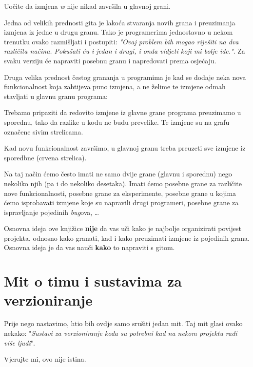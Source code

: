 

Uočite da izmjena \emph w nije nikad završila u glavnoj grani. 

Jedna od velikih prednosti gita je lakoća stvaranja novih grana i preuzimanja izmjena iz jedne u drugu granu. 
Tako je programerima jednostavno u nekom trenutku ovako razmišljati i postupiti: \emph{"Ovaj problem bih mogao riješiti na dva različita načina. Pokušati ću i jedan i drugi, i onda vidjeti koji mi bolje ide."}. Za svaku verziju će napraviti posebnu granu i napredovati prema osjećaju.

Druga velika prednost čestog grananja u programima je kad se dodaje neka nova funkcionalnost koja zahtijeva puno izmjena, a ne želime te izmjene odmah stavljati u glavnu granu programa:



Trebamo pripaziti da redovito izmjene iz glavne grane programa preuzimamo u sporednu, tako da razlike u kodu ne budu prevelike. 
Te izmjene su na grafu označene sivim strelicama.

Kad novu funkcionalnost završimo, u glavnoj granu treba preuzeti sve izmjene iz sporedbne (crvena strelica).

Na taj način ćemo često imati ne samo dvije grane (glavnu i sporednu) nego nekoliko njih (pa i do nekoliko desetaka). 
Imati ćemo posebne grane za različite nove funkcionalnosti, posebne grane za eksperimente, posebne grane u kojima ćemo isprobavati izmjene koje su napravili drugi programeri, posebne grane za ispravljanje pojedinih \emph{bug}ova, \dots

Osnovna ideja ove knjižice \textbf{nije} da vas uči kako je najbolje organizirati povijest projekta, odnosno kako granati, kad i kako preuzimati izmjene iz pojedinih grana. Osnovna ideja je da vas nauči \textbf{kako} to napraviti s gitom. 

\section*{Mit o timu i sustavima za verzioniranje}

Prije nego nastavimo, htio bih ovdje samo srušiti jedan mit. 
Taj mit glasi ovako nekako: "\emph{Sustavi za verzioniranje koda su potrebni kad na nekom projektu radi više ljudi}".

Vjerujte mi, ovo nije istina.

